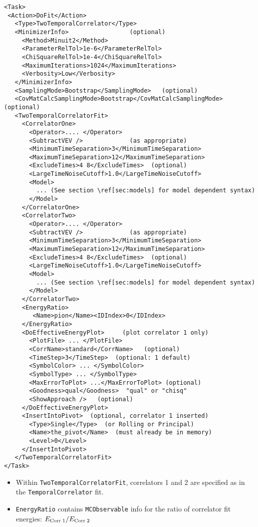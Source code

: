 \documentclass[12pt]{article}
\newcommand{\vb}{\texttt}
\begin{document}
\begin{verbatim}
<Task>
 <Action>DoFit</Action>
   <Type>TwoTemporalCorrelator</Type>
   <MinimizerInfo>                 (optional)
     <Method>Minuit2</Method>
     <ParameterRelTol>1e-6</ParameterRelTol>
     <ChiSquareRelTol>1e-4</ChiSquareRelTol>
     <MaximumIterations>1024</MaximumIterations>
     <Verbosity>Low</Verbosity>
   </MinimizerInfo>
   <SamplingMode>Bootstrap</SamplingMode>   (optional)
   <CovMatCalcSamplingMode>Bootstrap</CovMatCalcSamplingMode> (optional)
   <TwoTemporalCorrelatorFit>
     <CorrelatorOne>
       <Operator>.... </Operator>
       <SubtractVEV />             (as appropriate)
       <MinimumTimeSeparation>3</MinimumTimeSeparation>
       <MaximumTimeSeparation>12</MaximumTimeSeparation>
       <ExcludeTimes>4 8</ExcludeTimes>  (optional)
       <LargeTimeNoiseCutoff>1.0</LargeTimeNoiseCutoff>
       <Model>
         ... (See section \ref[sec:models] for model dependent syntax)
       </Model>
     </CorrelatorOne>
     <CorrelatorTwo>
       <Operator>.... </Operator>
       <SubtractVEV />             (as appropriate)
       <MinimumTimeSeparation>3</MinimumTimeSeparation>
       <MaximumTimeSeparation>12</MaximumTimeSeparation>
       <ExcludeTimes>4 8</ExcludeTimes>  (optional)
       <LargeTimeNoiseCutoff>1.0</LargeTimeNoiseCutoff>
       <Model>
         ... (See section \ref[sec:models] for model dependent syntax)
       </Model>
     </CorrelatorTwo>
     <EnergyRatio>
        <Name>pion</Name><IDIndex>0</IDIndex>
     </EnergyRatio>
     <DoEffectiveEnergyPlot>     (plot correlator 1 only)
       <PlotFile> ... </PlotFile>
       <CorrName>standard</CorrName>   (optional)
       <TimeStep>3</TimeStep>  (optional: 1 default)
       <SymbolColor> ... </SymbolColor>
       <SymbolType> ... </SymbolType>
       <MaxErrorToPlot> ...</MaxErrorToPlot> (optional)
       <Goodness>qual</Goodness>  "qual" or "chisq"
       <ShowApproach />   (optional)
     </DoEffectiveEnergyPlot>
     <InsertIntoPivot>  (optional, correlator 1 inserted)
       <Type>Single</Type>  (or Rolling or Principal)
       <Name>the_pivot</Name>  (must already be in memory)
       <Level>0</Level>
     </InsertIntoPivot>
   </TwoTemporalCorrelatorFit>
</Task>
\end{verbatim}
\begin{itemize}
\item Within \vb{TwoTemporalCorrelatorFit}, correlators 1 and 2 are specified as in the \vb{TemporalCorrelator}
  fit.
\item \vb{EnergyRatio} contains \vb{MCObservable} info for the ratio of correlator fit energies:
  $E_{{\rm Corr}\;1} / E_{{\rm Corr}\;2}$
\end{itemize}
\end{document}
